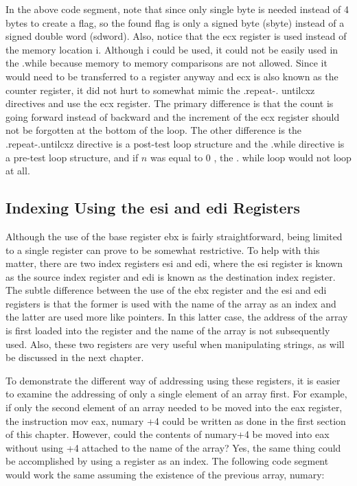 \documentclass[10pt]{book}
\begin{document}
In the above code segment, note that since only single byte is needed instead of 4 bytes to create a flag, so the found flag is only a signed byte (sbyte) instead of a signed double word (sdword). Also, notice that the ecx register is used instead of the memory location i. Although i could be used, it could not be easily used in the .while because memory to memory comparisons are not allowed. Since it would need to be transferred to a register anyway and ecx is also known as the counter register, it did not hurt to somewhat mimic the .repeat-. untilcxz directives and use the ecx register. The primary difference is that the count is going forward instead of backward and the increment of the ecx register should not be forgotten at the bottom of the loop. The other difference is the .repeat-.untilcxz directive is a post-test loop structure and the .while directive is a pre-test loop structure, and if $n$ was equal to 0 , the . while loop would not loop at all.

\subsection{Indexing Using the esi and edi Registers}
Although the use of the base register ebx is fairly straightforward, being limited to a single register can prove to be somewhat restrictive. To help with this matter, there are two index registers esi and edi, where the esi register is known as the source index register and edi is known as the destination index register. The subtle difference between the use of the ebx register and the esi and edi registers is that the former is used with the name of the array as an index and the latter are used more like pointers. In this latter case, the address of the array is first loaded into the register and the name of the array is not subsequently used. Also, these two registers are very useful when manipulating strings, as will be discussed in the next chapter.


To demonstrate the different way of addressing using these registers, it is easier to examine the addressing of only a single element of an array first. For example, if only the second element of an array needed to be moved into the eax register, the instruction mov eax, numary +4 could be written as done in the first section of this chapter. However, could the contents of numary+4 be moved into eax without using +4 attached to the name of the array? Yes, the same thing could be accomplished by using a register as an index. The following code segment would work the same assuming the existence of the previous array, numary:
\end{document}
